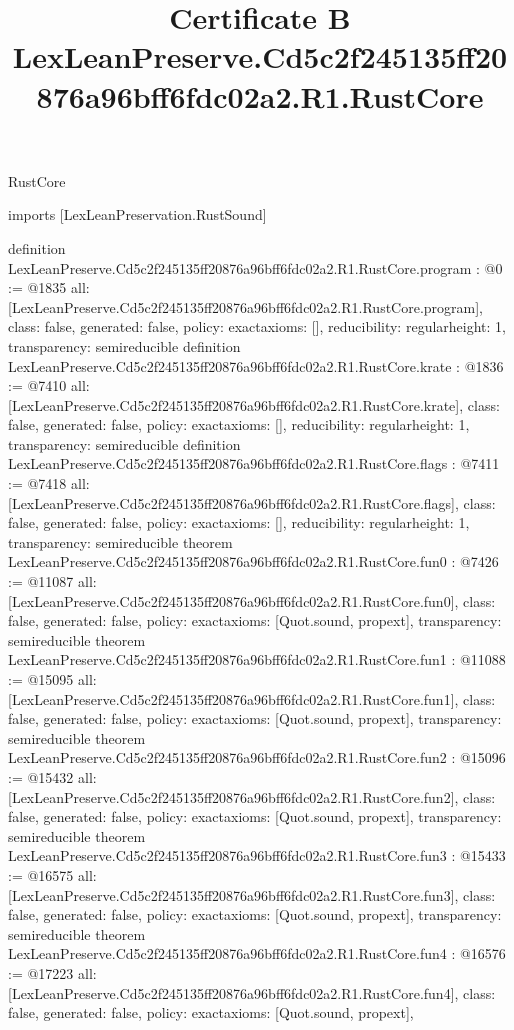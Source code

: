 \begin{lexlean}{RustCore}
\title{Certificate B LexLeanPreserve.Cd5c2f245135ff20876a96bff6fdc02a2.R1.RustCore}
\begin{coremodule}
imports [LexLeanPreservation.RustSound]

definition LexLeanPreserve.Cd5c2f245135ff20876a96bff6fdc02a2.R1.RustCore.program : @0 := @1835 {
  all: [LexLeanPreserve.Cd5c2f245135ff20876a96bff6fdc02a2.R1.RustCore.program],
  class: false,
  generated: false,
  policy: exact{axioms: []},
  reducibility: regular{height: 1},
  transparency: semireducible
}
definition LexLeanPreserve.Cd5c2f245135ff20876a96bff6fdc02a2.R1.RustCore.krate : @1836 := @7410 {
  all: [LexLeanPreserve.Cd5c2f245135ff20876a96bff6fdc02a2.R1.RustCore.krate],
  class: false,
  generated: false,
  policy: exact{axioms: []},
  reducibility: regular{height: 1},
  transparency: semireducible
}
definition LexLeanPreserve.Cd5c2f245135ff20876a96bff6fdc02a2.R1.RustCore.flags : @7411 := @7418 {
  all: [LexLeanPreserve.Cd5c2f245135ff20876a96bff6fdc02a2.R1.RustCore.flags],
  class: false,
  generated: false,
  policy: exact{axioms: []},
  reducibility: regular{height: 1},
  transparency: semireducible
}
theorem LexLeanPreserve.Cd5c2f245135ff20876a96bff6fdc02a2.R1.RustCore.fun0 : @7426 := @11087 {
  all: [LexLeanPreserve.Cd5c2f245135ff20876a96bff6fdc02a2.R1.RustCore.fun0],
  class: false,
  generated: false,
  policy: exact{axioms: [Quot.sound, propext]},
  transparency: semireducible
}
theorem LexLeanPreserve.Cd5c2f245135ff20876a96bff6fdc02a2.R1.RustCore.fun1 : @11088 := @15095 {
  all: [LexLeanPreserve.Cd5c2f245135ff20876a96bff6fdc02a2.R1.RustCore.fun1],
  class: false,
  generated: false,
  policy: exact{axioms: [Quot.sound, propext]},
  transparency: semireducible
}
theorem LexLeanPreserve.Cd5c2f245135ff20876a96bff6fdc02a2.R1.RustCore.fun2 : @15096 := @15432 {
  all: [LexLeanPreserve.Cd5c2f245135ff20876a96bff6fdc02a2.R1.RustCore.fun2],
  class: false,
  generated: false,
  policy: exact{axioms: [Quot.sound, propext]},
  transparency: semireducible
}
theorem LexLeanPreserve.Cd5c2f245135ff20876a96bff6fdc02a2.R1.RustCore.fun3 : @15433 := @16575 {
  all: [LexLeanPreserve.Cd5c2f245135ff20876a96bff6fdc02a2.R1.RustCore.fun3],
  class: false,
  generated: false,
  policy: exact{axioms: [Quot.sound, propext]},
  transparency: semireducible
}
theorem LexLeanPreserve.Cd5c2f245135ff20876a96bff6fdc02a2.R1.RustCore.fun4 : @16576 := @17223 {
  all: [LexLeanPreserve.Cd5c2f245135ff20876a96bff6fdc02a2.R1.RustCore.fun4],
  class: false,
  generated: false,
  policy: exact{axioms: [Quot.sound, propext]},
}
\end{coremodule}
\end{lexlean}

